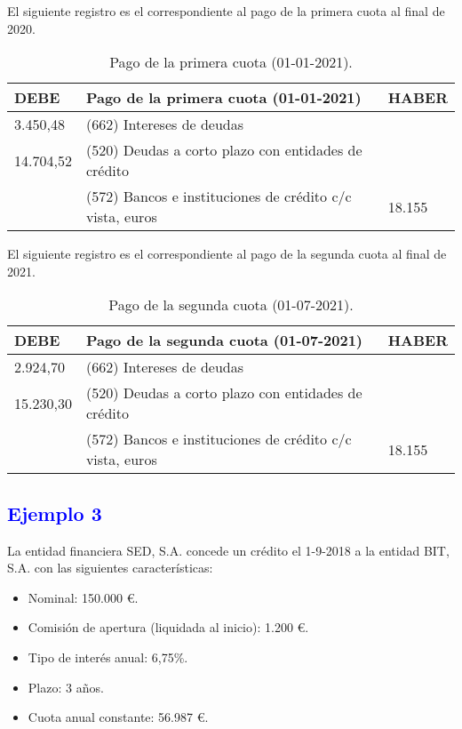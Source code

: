El siguiente registro es el correspondiente al pago de la primera cuota al final de 2020.

\begin{table}[H]
    \centering
    \begin{tabular}{|p{2cm}|p{6cm}|p{2cm}|}
        \hline
        \rowcolor{blue!30}
        \textbf{DEBE} & \textbf{Pago de la primera cuota (01-01-2021)} & \textbf{HABER} \\
        \hline
        3.450,48 & (662) Intereses de deudas & \\
        \hline
        14.704,52 & (520) Deudas a corto plazo con entidades de crédito & \\
        \hline
        & (572) Bancos e instituciones de crédito c/c vista, euros & 18.155 \\
        \hline
    \end{tabular}
    \caption{Pago de la primera cuota (01-01-2021).}
    \label{tabla:pago_primera_cuota}
\end{table}

El siguiente registro es el correspondiente al pago de la segunda cuota al final de 2021.

\begin{table}[H]
    \centering
    \begin{tabular}{|p{2cm}|p{6cm}|p{2cm}|}
        \hline
        \rowcolor{blue!30}
        \textbf{DEBE} & \textbf{Pago de la segunda cuota (01-07-2021)} & \textbf{HABER} \\
        \hline
        2.924,70 & (662) Intereses de deudas & \\
        \hline
        15.230,30 & (520) Deudas a corto plazo con entidades de crédito & \\
        \hline
        & (572) Bancos e instituciones de crédito c/c vista, euros & 18.155 \\
        \hline
    \end{tabular}
    \caption{Pago de la segunda cuota (01-07-2021).}
    \label{tabla:pago_segunda_cuota}
\end{table}
\newpage
\subsection*{\textcolor{blue}{Ejemplo 3}}

La entidad financiera SED, S.A. concede un crédito el 1-9-2018 a la entidad BIT, S.A. con las siguientes características:
\begin{itemize}
    \item Nominal: 150.000 €.
    \item Comisión de apertura (liquidada al inicio): 1.200 €.
    \item Tipo de interés anual: 6,75\%.
    \item Plazo: 3 años.
    \item Cuota anual constante: 56.987 €.
\end{itemize}


